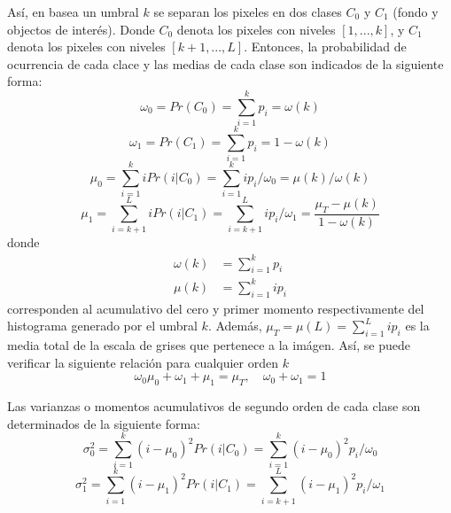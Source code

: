 \documentclass[preprint,12pt]{elsarticle}
\begin{document}
Así, en basea un umbral $k$ se separan los pixeles en dos clases $C_0$ y $C_1$ (fondo y objectos de interés).
%
Donde $C_0$ denota los pixeles con niveles $[1,...,k]$, y $C_1$ denota los pixeles con niveles $[k+1,...,L]$.
%
Entonces, la probabilidad de ocurrencia de cada clace y las medias de cada clase son indicados de la siguiente forma:
\begin{equation}
    \omega_0 = Pr(C_0) = \sum_{i=1}^k p_i = \omega(k)
\end{equation}
\begin{equation}
    \omega_1 = Pr(C_1) = \sum_{i=1}^k p_i = 1-\omega(k)
\end{equation}
\begin{equation}
    \mu_0 = \sum_{i=1}^k i Pr(i|C_0) = \sum_{i=1}^k i p_i / \omega_0 = \mu(k)/\omega(k)
\end{equation}
\begin{equation}
    \mu_1 = \sum_{i=k+1}^L i Pr(i|C_1) = \sum_{i=k+1}^L i p_i / \omega_1 = \frac{\mu_T - \mu(k)}{1-\omega(k)}
\end{equation}
donde
\begin{equation}
  \begin{split}
    \omega(k) &= \sum_{i=1}^k  p_i \\
    \mu(k) &= \sum_{i=1}^k i p_i
  \end{split}
\end{equation}
corresponden al acumulativo del cero y primer momento respectivamente del histograma generado por el umbral $k$.
%
Además, $\mu_T = \mu(L) = \sum_{i=1}^L i p_i$ es la media total de la escala de grises que pertenece a la imágen.
%
Así, se puede verificar la siguiente relación para cualquier orden $k$
\begin{equation}
    \omega_0 \mu_0 + \omega_1 + \mu_1 = \mu_T, \quad \omega_0 + \omega_1 = 1
\end{equation}

Las varianzas o momentos acumulativos de segundo orden de cada clase son determinados de la siguiente forma:
\begin{equation}
    \sigma_0 ^2 = \sum_{i=1}^k (i-\mu_0)^2 Pr(i | C_0) = \sum_{i=1}^k (i-\mu_0)^2  p_i / \omega_0
\end{equation}
\begin{equation}
    \sigma_1 ^2 = \sum_{i=1}^k (i-\mu_1)^2 Pr(i | C_1) = \sum_{i=k+1}^L (i-\mu_1)^2  p_i / \omega_1
\end{equation}
\end{document}
